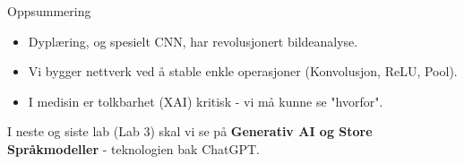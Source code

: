 \documentclass[aspectratio=169]{beamer}
\begin{document}
\begin{frame}{Oppsummering}
    \begin{itemize}
        \item Dyplæring, og spesielt CNN, har revolusjonert bildeanalyse.
        \item Vi bygger nettverk ved å stable enkle operasjoner (Konvolusjon, ReLU, Pool).
        \item I medisin er tolkbarhet (XAI) kritisk - vi må kunne se "hvorfor".
    \end{itemize}
    
    I neste og siste lab (Lab 3) skal vi se på \textbf{Generativ AI og Store Språkmodeller} - teknologien bak ChatGPT.
\end{frame}
\end{document}
